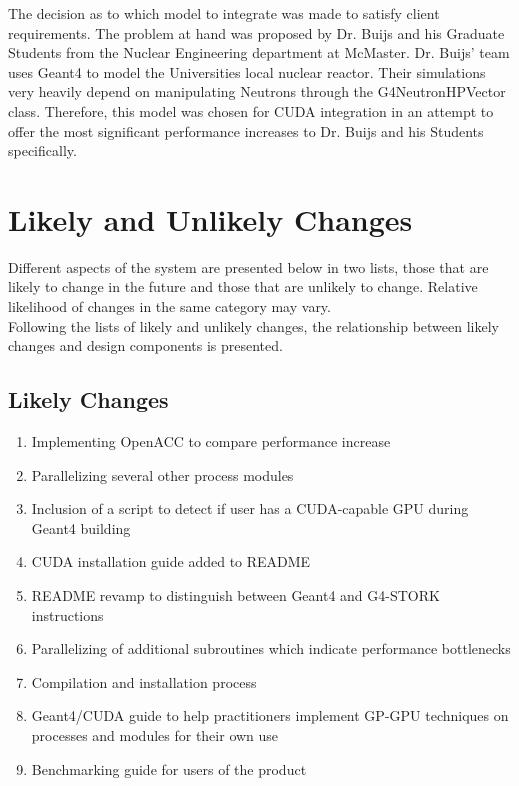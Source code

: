 \documentclass[12pt]{article}
\begin{document}
The decision as to which model to integrate was made to satisfy client requirements. The problem at hand was proposed by Dr. Buijs and his Graduate Students from the Nuclear Engineering department at McMaster. Dr. Buijs' team uses Geant4 to model the Universities local nuclear reactor. Their simulations very heavily depend on manipulating Neutrons through the G4NeutronHPVector class. Therefore, this model was chosen for CUDA integration in an attempt to offer the most significant performance increases to Dr. Buijs and his Students specifically.\\

\section{Likely and Unlikely Changes}
Different aspects of the system are presented below in two lists, those that are likely to change in the future and those that are unlikely to change. Relative likelihood of changes in the same category may vary.\\

Following the lists of likely and unlikely changes, the relationship between likely changes and design components is presented.

\subsection{Likely Changes} %
\begin{enumerate}
\item Implementing OpenACC to compare performance increase
\item Parallelizing several other process modules
\item Inclusion of a script to detect if user has a CUDA-capable GPU during Geant4 building
\item CUDA installation guide added to README
\item README revamp to distinguish between Geant4 and G4-STORK instructions
\item Parallelizing of additional subroutines which indicate performance bottlenecks
\item Compilation and installation process
\item Geant4/CUDA guide to help practitioners implement GP-GPU techniques on processes and modules for their own use
\item Benchmarking guide for users of the product
\end{enumerate}
\end{document}
